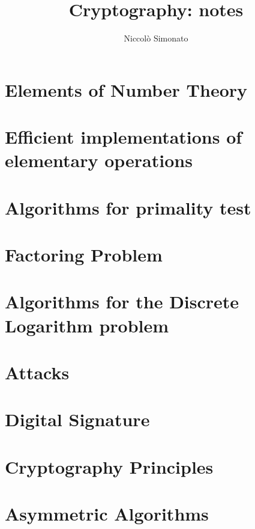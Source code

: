 \documentclass[12pt, a4paper, english]{report}
\author{Niccolò Simonato}
\title{Cryptography: notes}
\begin{document}
\maketitle

\tableofcontents

\chapter{Elements of Number Theory}


\chapter{Efficient implementations of elementary operations}


\chapter{Algorithms for primality test}


\chapter{Factoring Problem}


\chapter{Algorithms for the Discrete Logarithm problem}


\chapter{Attacks}


\chapter{Digital Signature}


\chapter{Cryptography Principles}


\chapter{Asymmetric Algorithms}

\end{document}
